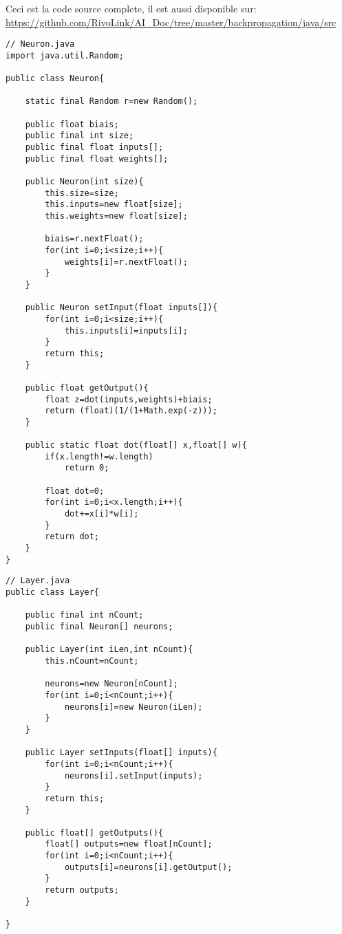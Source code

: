 \documentclass{article}
\begin{document}
\newpage

Ceci est la code source complete, il est aussi disponible sur: \url{https://github.com/RivoLink/AI_Doc/tree/master/backpropagation/java/src}

\begin{lstlisting}
// Neuron.java
import java.util.Random;

public class Neuron{

	static final Random r=new Random();
	
	public float biais;
	public final int size;
	public final float inputs[];
	public final float weights[];
	
	public Neuron(int size){
		this.size=size;
		this.inputs=new float[size];
		this.weights=new float[size];
		
		biais=r.nextFloat();
		for(int i=0;i<size;i++){
			weights[i]=r.nextFloat();
		}
	}
	
	public Neuron setInput(float inputs[]){
		for(int i=0;i<size;i++){
			this.inputs[i]=inputs[i];
		}
		return this;
	}
	
	public float getOutput(){
		float z=dot(inputs,weights)+biais;
		return (float)(1/(1+Math.exp(-z)));
	}

	public static float dot(float[] x,float[] w){
		if(x.length!=w.length)
			return 0;

		float dot=0;
		for(int i=0;i<x.length;i++){
			dot+=x[i]*w[i];
		}
		return dot;
	}
}

\end{lstlisting}

\newpage

\begin{lstlisting}
// Layer.java
public class Layer{
	
	public final int nCount;
	public final Neuron[] neurons;
	
	public Layer(int iLen,int nCount){
		this.nCount=nCount;
		
		neurons=new Neuron[nCount];
		for(int i=0;i<nCount;i++){
			neurons[i]=new Neuron(iLen);
		}
	}
	
	public Layer setInputs(float[] inputs){
		for(int i=0;i<nCount;i++){
			neurons[i].setInput(inputs);
		}
		return this;
	}
	
	public float[] getOutputs(){
		float[] outputs=new float[nCount];
		for(int i=0;i<nCount;i++){
			outputs[i]=neurons[i].getOutput();
		}
		return outputs;
	}
	
}

\end{lstlisting}
\end{document}
